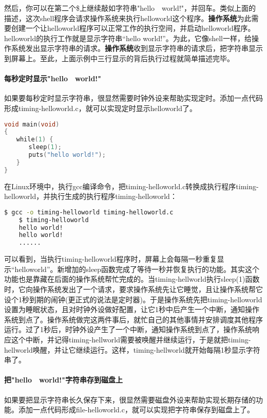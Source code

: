然后，你可以在第二个\$上继续敲如字符串"hello　world!"，并回车。类似上面的描述，这次shell程序会请求操作系统来执行helloworld这个程序。\textbf{操作系统}为此需要创建一个让helloworld程序可以正常工作的执行空间，并启动helloworld程序。helloworld的执行工作就是显示字符串“hello world!”。为此，它像shell一样，给操作系统发出显示字符串的请求。\textbf{操作系统}收到显示字符串的请求后，把字符串显示到屏幕上。至此，上面示例中三行显示的背后执行过程就简单描述完毕。

\paragraph{每秒定时显示"hello　world!"}
如果要每秒定时显示字符串，很显然需要时钟外设来帮助实现定时。添加一点代码形成timing-helloworld.c，就可以实现定时显示helloworld了。
\begin{lstlisting}[language={C}]
void main(void)
{
　　while(1) {
　　　　sleep(1);
　　　　puts("hello world!");
　　}
}
\end{lstlisting}

在Linux环境中，执行gcc编译命令，把timing-helloworld.c转换成执行程序timing-helloworld，并执行生成的执行程序timing-helloworld：
\begin{lstlisting}[language={bash}]
	$ gcc -o timing-helloworld timing-helloworld.c
	$ timing-helloworld
	hello world!
	hello world!
	......
\end{lstlisting}

可以看到，当执行timing-helloworld程序时，屏幕上会每隔一秒重复显示“helloworld”。新增加的sleep函数完成了等待一秒并恢复执行的功能。其实这个功能也是靠藏在后面的操作系统帮忙完成的。当timing-hellworld执行sleep(1)函数时，它向操作系统发出了一个请求，要求操作系统先让它睡觉，且让操作系统帮它设个1秒到期的闹钟(更正式的说法是定时器)。于是操作系统先把timing-helloworld设置为睡眠状态，且对时钟外设做好配置，让它1秒中后产生一个中断，通知操作系统到点了。操作系统做完这两件事后，就忙自己的其他事情并安排调度其他程序运行。过了1秒后，时钟外设产生了一个中断，通知操作系统到点了，操作系统响应这个中断，并记得timing-hellworld需要被唤醒并继续运行，于是就把timing-hellworld唤醒，并让它继续运行。这样，timing-hellworld就开始每隔1秒显示字符串了。



\paragraph{把"hello　world!"字符串存到磁盘上}

如果要把显示字符串长久保存下来，很显然需要磁盘外设来帮助实现长期存储的功能。添加一点代码形成file-helloworld.c，就可以实现把字符串保存到磁盘上了。

